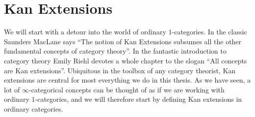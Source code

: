 \documentclass[../../thesis.tex]{subfiles}
\begin{document}
\section{Kan Extensions}\label{KanSection}
We will start with a detour into the world of ordinary $1$-categories.
In the  classic \cite{MacLane} Saunders MacLane says ``The notion of Kan Extensions subsumes all the other fundamental concepts of category theory''.
In the fantastic introduction to category theory \cite{CatContext} Emily Riehl devotes a whole chapter to the slogan ``All concepts are Kan extensions''.
Ubiquitous in the toolbox of any category theorist, Kan extensions are central for most everything we do in this thesis.
As we have seen, a lot of $\infty$-categorical concepts can be thought of as if we are working with ordinary $1$-categories, and we will therefore start by defining Kan extensions in ordinary categories.
\end{document}
